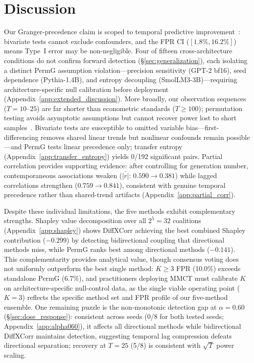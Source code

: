 \section{Discussion}\label{sec:discussion}

Our Granger-precedence claim is scoped to temporal predictive improvement~\citep{granger1969investigating,shojaie2022granger}: bivariate tests cannot exclude confounders, and the FPR CI ($[1.8\%, 16.2\%]$) means Type~I error may be non-negligible.
Four of fifteen cross-architecture conditions do not confirm forward detection (\S\ref{sec:generalization}), each isolating a distinct PermG assumption violation---precision sensitivity (GPT-2 bf16), seed dependence (Pythia-1.4B), and entropy decoupling (SmolLM3-3B)---requiring architecture-specific null calibration before deployment (Appendix~\ref{app:extended_discussion}).
More broadly, our observation sequences ($T{=}10$--$25$) are far shorter than econometric standards ($T{\geq}100$); permutation testing avoids asymptotic assumptions but cannot recover power lost to short samples~\citep{shojaie2022granger}.
Bivariate tests are susceptible to omitted variable bias---first-differencing removes shared linear trends but nonlinear confounds remain possible---and PermG tests linear precedence only; transfer entropy (Appendix~\ref{app:transfer_entropy}) yields 0/192 significant pairs.
Partial correlation provides supporting evidence: after controlling for generation number, contemporaneous associations weaken ($\bar{|r|}$: $0.590{\to}0.381$) while lagged correlations strengthen ($0.759{\to}0.841$), consistent with genuine temporal precedence rather than shared-trend artifacts (Appendix~\ref{app:partial_corr}).

Despite these individual limitations, the five methods exhibit complementary strengths.
Shapley value decomposition over all $2^5{=}32$ coalitions (Appendix~\ref{app:shapley}) shows DiffXCorr achieving the best combined Shapley contribution ($-0.299$) by detecting bidirectional coupling that directional methods miss, while PermG ranks best among directional methods ($-0.141$).
This complementarity provides analytical value, though consensus voting does not uniformly outperform the best single method: $K{\geq}3$ FPR (10.0\%) exceeds standalone PermG (6.7\%), and practitioners deploying MMCT must calibrate $K$ on architecture-specific null-control data, as the single viable operating point ($K{=}3$) reflects the specific method set and FPR profile of our five-method ensemble.
One remaining puzzle is the non-monotonic detection gap at $\alpha{=}0.60$ (\S\ref{sec:dose_response}): consistent across seeds (0/8 for both tested seeds; Appendix~\ref{app:alpha060}), it affects all directional methods while bidirectional DiffXCorr maintains detection, suggesting temporal lag compression defeats directional separation; recovery at $T{=}25$ (5/8) is consistent with $\sqrt{T}$ power scaling.

